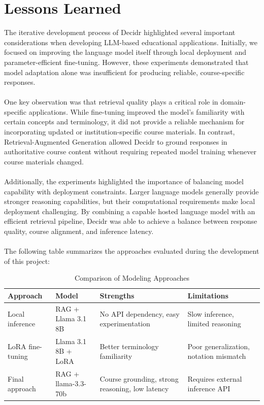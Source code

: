 \documentclass[12pt, a4paper]{report}
\begin{document}
\section{Lessons Learned}
The iterative development process of Decidr highlighted several important considerations when developing LLM-based educational applications. Initially, we focused on improving the language model itself through local deployment and parameter-efficient fine-tuning. However, these experiments demonstrated that model adaptation alone was insufficient for producing reliable, course-specific responses.~\\~\\
One key observation was that retrieval quality plays a critical role in domain-specific applications. While fine-tuning improved the model's familiarity with certain concepts and terminology, it did not provide a reliable mechanism for incorporating updated or institution-specific course materials. In contrast, Retrieval-Augmented Generation allowed Decidr to ground responses in authoritative course content without requiring repeated model training whenever course materials changed.~\\~\\
Additionally, the experiments highlighted the importance of balancing model capability with deployment constraints. Larger language models generally provide stronger reasoning capabilities, but their computational requirements make local deployment challenging. By combining a capable hosted language model with an efficient retrieval pipeline, Decidr was able to achieve a balance between response quality, course alignment, and inference latency.~\\~\\
The following table summarizes the approaches evaluated during the development of this project:
\begin{table}[htbp]
\centering
\renewcommand{\arraystretch}{1.3}
\begin{tabular}{@{}llp{4.5cm}p{4.5cm}@{}}
\toprule
\textbf{Approach} & \textbf{Model} & \textbf{Strengths} & \textbf{Limitations} \\ 
\midrule
Local inference   & RAG + Llama 3.1 8B   & No API dependency, easy experimentation         & Slow inference, limited reasoning       \\ 
LoRA fine-tuning  & Llama 3.1 8B + LoRA & Better terminology familiarity               & Poor generalization, notation mismatch  \\ 
Final approach    & RAG + llama-3.3-70b & Course grounding, strong reasoning, low latency & Requires external inference API         \\ 
\bottomrule
\end{tabular}
\caption{Comparison of Modeling Approaches}
\label{tab:model-comparison}
\end{table}
\end{document}
